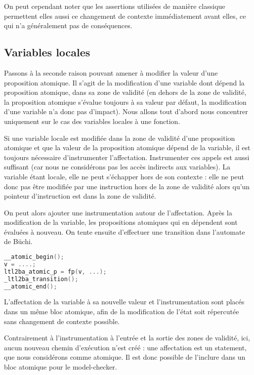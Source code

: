 On peut cependant noter que les assertions utilisées de manière
classique permettent elles aussi ce changement de contexte immédiatement
avant elles, ce qui n'a généralement pas de conséquences.

\subsection{Variables locales}

Passons à la seconde raison pouvant amener à modifier la valeur d'une
proposition atomique. Il s'agit de la modification d'une variable dont
dépend la proposition atomique, dans sa zone de validité (en dehors de
la zone de validité, la proposition atomique s'évalue toujours à sa
valeur par défaut, la modification d'une variable n'a donc pas
d'impact). Nous allons tout d'abord nous concentrer uniquement sur le
cas des variables locales à une fonction.

Si une variable locale est modifiée dans la zone de validité d'une
proposition atomique et que la valeur de la proposition atomique dépend
de la variable, il est toujours nécessaire d'instrumenter l'affectation.
Instrumenter ces appels est aussi suffisant (car nous ne considérons pas
les accès indirects aux variables). La variable étant locale, elle ne
peut s'échapper hors de son contexte : elle ne peut donc pas être
modifiée par une instruction hors de la zone de validité alors qu'un
pointeur d'instruction est dans la zone de validité.

On peut alors ajouter une instrumentation autour de l'affectation. Après
la modification de la variable, les propositions atomiques qui en
dépendent sont évaluées à nouveau. On tente ensuite d'effectuer une
transition dans l'automate de Büchi.

\begin{lstlisting}[language=C]
__atomic_begin();
v = ....;
ltl2ba_atomic_p = fp(v, ...);
_ltl2ba_transition();
__atomic_end();
\end{lstlisting}

L'affectation de la variable à sa nouvelle valeur et l'instrumentation
sont placés dans un même bloc atomique, afin de la modification de
l'état soit répercutée sans changement de contexte possible.

Contrairement à l'instrumentation à l'entrée et la sortie des zones de
validité, ici, aucun nouveau chemin d'exécution n'est créé : une
affectation est un statement, que nous considérons comme atomique. Il
est donc possible de l'inclure dans un bloc atomique pour le
model-checker.

